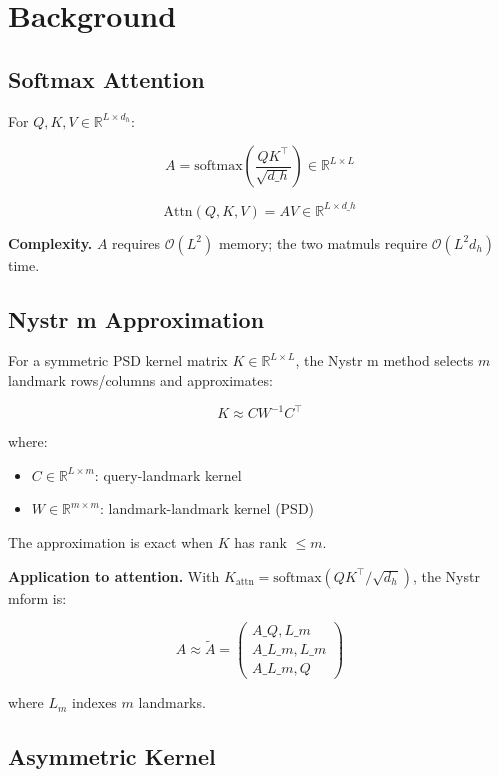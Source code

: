
\section{Background}

\subsection{Softmax Attention}

For $Q, K, V \in \mathbb{R}^{L \times d_h}$:

\[
A = \text{softmax}\!\left(\frac{Q K^\top}{\sqrt{d\_h}}\right) \in \mathbb{R}^{L \times L}
\]

\[
\text{Attn}(Q, K, V) = A V \in \mathbb{R}^{L \times d\_h}
\]

\textbf{Complexity.} $A$ requires $\mathcal{O}(L^2)$ memory; the two matmuls 
require $\mathcal{O}(L^2 d_h)$ time.

\subsection{Nystr m Approximation}

For a symmetric PSD kernel matrix $K \in \mathbb{R}^{L \times L}$, the Nystr m 
method selects $m$ landmark rows/columns and approximates:

\[
K \approx C W^{-1} C^\top
\]

where:

\begin{itemize}
\item $C \in \mathbb{R}^{L \times m}$: query-landmark kernel
\item $W \in \mathbb{R}^{m \times m}$: landmark-landmark kernel (PSD)

\end{itemize}
The approximation is exact when $K$ has rank $\le m$.

\textbf{Application to attention.} With $K_\text{attn} = \text{softmax}(QK^\top / \sqrt{d_h})$, 
the Nystr mform is:

\[
A \approx \tilde{A} = \begin{pmatrix} A\_{Q, L\_m} \\ A\_{L\_m, L\_m} \\ A\_{L\_m, Q} \end{pmatrix}
\]

where $L_m$ indexes $m$ landmarks.

\subsection{Asymmetric Kernel}

